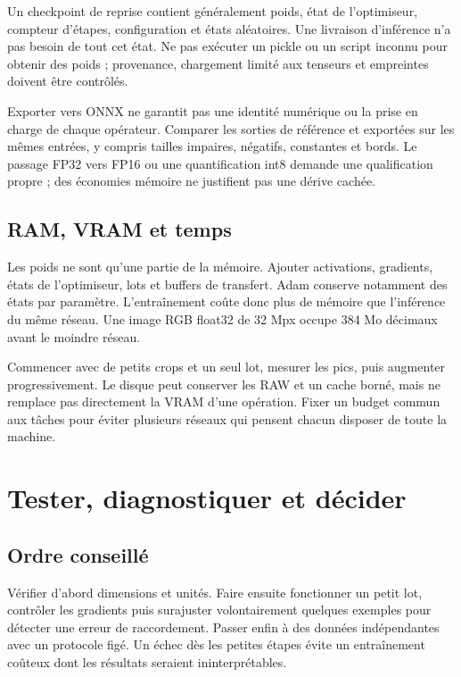 \documentclass[12pt,a4paper,oneside]{report}
\begin{document}
Un checkpoint de reprise contient généralement poids, état de l'optimiseur,
compteur d'étapes, configuration et états aléatoires. Une livraison d'inférence
n'a pas besoin de tout cet état. Ne pas exécuter un pickle ou un script inconnu
pour obtenir des poids ; provenance, chargement limité aux tenseurs et
empreintes doivent être contrôlés.

Exporter vers ONNX ne garantit pas une identité numérique ou la prise en
charge de chaque opérateur. Comparer les sorties de référence et exportées
sur les mêmes entrées, y compris tailles impaires, négatifs, constantes et
bords. Le passage FP32 vers FP16 ou une quantification int8 demande une
qualification propre ; des économies mémoire ne justifient pas une dérive cachée.

\section{RAM, VRAM et temps}

Les poids ne sont qu'une partie de la mémoire. Ajouter activations, gradients,
états de l'optimiseur, lots et buffers de transfert. Adam conserve notamment
des états par paramètre. L'entraînement coûte donc plus de mémoire que
l'inférence du même réseau. Une image RGB float32 de 32 Mpx occupe 384 Mo
décimaux avant le moindre réseau.

Commencer avec de petits crops et un seul lot, mesurer les pics, puis augmenter
progressivement. Le disque peut conserver les RAW et un cache borné, mais
ne remplace pas directement la VRAM d'une opération. Fixer un budget commun
aux tâches pour éviter plusieurs réseaux qui pensent chacun disposer de toute
la machine.

\chapter{Tester, diagnostiquer et décider}

\section{Ordre conseillé}

Vérifier d'abord dimensions et unités. Faire ensuite fonctionner un petit lot,
contrôler les gradients puis surajuster volontairement quelques exemples pour
détecter une erreur de raccordement. Passer enfin à des données indépendantes
avec un protocole figé. Un échec dès les petites étapes évite un entraînement
coûteux dont les résultats seraient ininterprétables.
\end{document}
